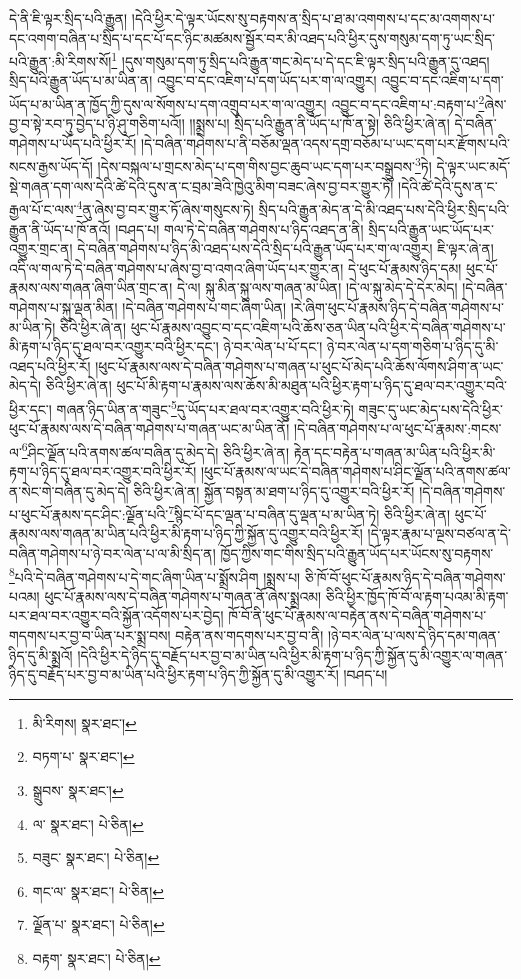 དེ་ནི་ཇི་ལྟར་སྲིད་པའི་རྒྱུན། །དེའི་ཕྱིར་དེ་ལྟར་ཡོངས་སུ་བརྟགས་ན་སྲིད་པ་ཐ་མ་འགགས་པ་དང་མ་འགགས་པ་དང་འགག་བཞིན་པ་སྲིད་པ་དང་པོ་དང་ཉིང་མཚམས་སྦྱོར་བར་མི་འཐད་པའི་ཕྱིར་དུས་གསུམ་དག་ཏུ་ཡང་སྲིད་པའི་རྒྱུན་:མི་རིགས་སོ།\footnote{མི་རིགས།  སྣར་ཐང་། } །དུས་གསུམ་དག་ཏུ་སྲིད་པའི་རྒྱུན་གང་མེད་པ་དེ་དང་ཇི་ལྟར་སྲིད་པའི་རྒྱུན་དུ་འཐད། སྲིད་པའི་རྒྱུན་ཡོད་པ་མ་ཡིན་ན། འབྱུང་བ་དང་འཇིག་པ་དག་ཡོད་པར་ག་ལ་འགྱུར། འབྱུང་བ་དང་འཇིག་པ་དག་ཡོད་པ་མ་ཡིན་ན་ཁྱོད་ཀྱི་དུས་ལ་སོགས་པ་དག་འགྲུབ་པར་ག་ལ་འགྱུར། འབྱུང་བ་དང་འཇིག་པ་:བརྟག་པ་\footnote{བཏག་པ་  སྣར་ཐང་། }ཞེས་བྱ་བ་སྟེ་རབ་ཏུ་བྱེད་པ་ཉི་ཤུ་གཅིག་པའོ།། །།སྨྲས་པ། སྲིད་པའི་རྒྱུན་ནི་ཡོད་པ་ཁོ་ན་སྟེ། ཅིའི་ཕྱིར་ཞེ་ན། དེ་བཞིན་གཤེགས་པ་ཡོད་པའི་ཕྱིར་རོ། །དེ་བཞིན་གཤེགས་པ་ནི་བཅོམ་ལྡན་འདས་དགྲ་བཅོམ་པ་ཡང་དག་པར་རྫོགས་པའི་སངས་རྒྱས་ཡོད་དོ། །དེས་བསྐལ་པ་གྲངས་མེད་པ་དག་གིས་བྱང་ཆུབ་ཡང་དག་པར་བསྒྲུབས་\footnote{སྒྲུབས་  སྣར་ཐང་། }ཏེ། དེ་ལྟར་ཡང་མདོ་སྡེ་གཞན་དག་ལས་དེའི་ཚེ་དེའི་དུས་ན་ང་བྲམ་ཟེའི་ཁྱེའུ་མིག་བཟང་ཞེས་བྱ་བར་གྱུར་ཏོ། །དེའི་ཚེ་དེའི་དུས་ན་ང་རྒྱལ་པོ་ང་ལས་\footnote{ལ་  སྣར་ཐང་།  པེ་ཅིན། }ནུ་ཞེས་བྱ་བར་གྱུར་ཏོ་ཞེས་གསུངས་ཏེ། སྲིད་པའི་རྒྱུན་མེད་ན་དེ་མི་འཐད་པས་དེའི་ཕྱིར་སྲིད་པའི་རྒྱུན་ནི་ཡོད་པ་ཁོ་ནའོ། །བཤད་པ། གལ་ཏེ་དེ་བཞིན་གཤེགས་པ་ཉིད་འཐད་ན་ནི། སྲིད་པའི་རྒྱུན་ཡང་ཡོད་པར་འགྱུར་གྲང་ན། དེ་བཞིན་གཤེགས་པ་ཉིད་མི་འཐད་པས་དེའི་སྲིད་པའི་རྒྱུན་ཡོད་པར་ག་ལ་འགྱུར། ཇི་ལྟར་ཞེ་ན། འདི་ལ་གལ་ཏེ་དེ་བཞིན་གཤེགས་པ་ཞེས་བྱ་བ་འགའ་ཞིག་ཡོད་པར་གྱུར་ན། དེ་ཕུང་པོ་རྣམས་ཉིད་དམ། ཕུང་པོ་རྣམས་ལས་གཞན་ཞིག་ཡིན་གྲང་ན། དེ་ལ། སྐུ་མིན་སྐུ་ལས་གཞན་མ་ཡིན། །དེ་ལ་སྐུ་མེད་དེ་དེར་མེད། །དེ་བཞིན་གཤེགས་པ་སྐུ་ལྡན་མིན། །དེ་བཞིན་གཤེགས་པ་གང་ཞིག་ཡིན། །རེ་ཞིག་ཕུང་པོ་རྣམས་ཉིད་དེ་བཞིན་གཤེགས་པ་མ་ཡིན་ཏེ། ཅིའི་ཕྱིར་ཞེ་ན། ཕུང་པོ་རྣམས་འབྱུང་བ་དང་འཇིག་པའི་ཆོས་ཅན་ཡིན་པའི་ཕྱིར་དེ་བཞིན་གཤེགས་པ་མི་རྟག་པ་ཉིད་དུ་ཐལ་བར་འགྱུར་བའི་ཕྱིར་དང་། ཉེ་བར་ལེན་པ་པོ་དང་། ཉེ་བར་ལེན་པ་དག་གཅིག་པ་ཉིད་དུ་མི་འཐད་པའི་ཕྱིར་རོ། །ཕུང་པོ་རྣམས་ལས་དེ་བཞིན་གཤེགས་པ་གཞན་པ་ཕུང་པོ་མེད་པའི་ཆོས་ལོགས་ཤིག་ན་ཡང་མེད་དེ། ཅིའི་ཕྱིར་ཞེ་ན། ཕུང་པོ་མི་རྟག་པ་རྣམས་ལས་ཆོས་མི་མཐུན་པའི་ཕྱིར་རྟག་པ་ཉིད་དུ་ཐལ་བར་འགྱུར་བའི་ཕྱིར་དང་། གཞན་ཉིད་ཡིན་ན་གཟུང་\footnote{བཟུང་  སྣར་ཐང་།  པེ་ཅིན། }དུ་ཡོད་པར་ཐལ་བར་འགྱུར་བའི་ཕྱིར་ཏེ། གཟུང་དུ་ཡང་མེད་པས་དེའི་ཕྱིར་ཕུང་པོ་རྣམས་ལས་དེ་བཞིན་གཤེགས་པ་གཞན་ཡང་མ་ཡིན་ནོ། །དེ་བཞིན་གཤེགས་པ་ལ་ཕུང་པོ་རྣམས་:གངས་ལ་\footnote{གང་ལ་  སྣར་ཐང་།  པེ་ཅིན། }ཤིང་ལྗོན་པའི་ནགས་ཚལ་བཞིན་དུ་མེད་དེ། ཅིའི་ཕྱིར་ཞེ་ན། རྟེན་དང་བརྟེན་པ་གཞན་མ་ཡིན་པའི་ཕྱིར་མི་རྟག་པ་ཉིད་དུ་ཐལ་བར་འགྱུར་བའི་ཕྱིར་རོ། །ཕུང་པོ་རྣམས་ལ་ཡང་དེ་བཞིན་གཤེགས་པ་ཤིང་ལྗོན་པའི་ནགས་ཚལ་ན་སེང་གེ་བཞིན་དུ་མེད་དེ། ཅིའི་ཕྱིར་ཞེ་ན། སྐྱོན་བསྟན་མ་ཐག་པ་ཉིད་དུ་འགྱུར་བའི་ཕྱིར་རོ། །དེ་བཞིན་གཤེགས་པ་ཕུང་པོ་རྣམས་དང་ཤིང་:ལྗོན་པའི་\footnote{ལྗོན་པ་  སྣར་ཐང་།  པེ་ཅིན། }སྙིང་པོ་དང་ལྡན་པ་བཞིན་དུ་ལྡན་པ་མ་ཡིན་ཏེ། ཅིའི་ཕྱིར་ཞེ་ན། ཕུང་པོ་རྣམས་ལས་གཞན་མ་ཡིན་པའི་ཕྱིར་མི་རྟག་པ་ཉིད་ཀྱི་སྐྱོན་དུ་འགྱུར་བའི་ཕྱིར་རོ། །དེ་ལྟར་རྣམ་པ་ལྔས་བཙལ་ན་དེ་བཞིན་གཤེགས་པ་ཉེ་བར་ལེན་པ་ལ་མི་སྲིད་ན། ཁྱོད་ཀྱིས་གང་གིས་སྲིད་པའི་རྒྱུན་ཡོད་པར་ཡོངས་སུ་བརྟགས་\footnote{བརྟག་  སྣར་ཐང་།  པེ་ཅིན། }པའི་དེ་བཞིན་གཤེགས་པ་དེ་གང་ཞིག་ཡིན་པ་སྨྲོས་ཤིག །སྨྲས་པ། ཅི་ཁོ་བོ་ཕུང་པོ་རྣམས་ཉིད་དེ་བཞིན་གཤེགས་པའམ། ཕུང་པོ་རྣམས་ལས་དེ་བཞིན་གཤེགས་པ་གཞན་ནོ་ཞེས་སྨྲའམ། ཅིའི་ཕྱིར་ཁྱོད་ཁོ་བོ་ལ་རྟག་པའམ་མི་རྟག་པར་ཐལ་བར་འགྱུར་བའི་སྐྱོན་འདོགས་པར་བྱེད། ཁོ་བོ་ནི་ཕུང་པོ་རྣམས་ལ་བརྟེན་ནས་དེ་བཞིན་གཤེགས་པ་གདགས་པར་བྱ་བ་ཡིན་པར་སྨྲ་བས། བརྟེན་ནས་གདགས་པར་བྱ་བ་ནི། །ཉེ་བར་ལེན་པ་ལས་དེ་ཉིད་དམ་གཞན་ཉིད་དུ་མི་སྨྲའོ། །དེའི་ཕྱིར་དེ་ཉིད་དུ་བརྗོད་པར་བྱ་བ་མ་ཡིན་པའི་ཕྱིར་མི་རྟག་པ་ཉིད་ཀྱི་སྐྱོན་དུ་མི་འགྱུར་ལ་གཞན་ཉིད་དུ་བརྗོད་པར་བྱ་བ་མ་ཡིན་པའི་ཕྱིར་རྟག་པ་ཉིད་ཀྱི་སྐྱོན་དུ་མི་འགྱུར་རོ། །བཤད་པ། 